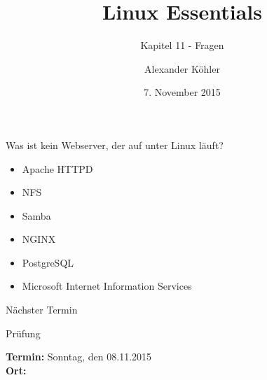 \documentclass[aspectratio=43]{beamer}
\title[Linux Essentials  - Kapitel 11 - Fragen]{Linux Essentials}
\subtitle{Kapitel 11 - Fragen}
\author{Alexander Köhler}
\date{7. November 2015}
\begin{document}
\logoframe

\frame{\titlepage}


\setcounter{tocdepth}{1}
\section[Gliederung]{}
\frame{\tableofcontents}



\begin{frame}{}
  \begin{block}{Was ist kein Webserver, der auf unter Linux läuft?}
    \begin{itemize}
      \item Apache HTTPD
      \item NFS
      \item Samba
      \item NGINX
      \item PostgreSQL
      \item Microsoft Internet Information Services
    \end{itemize}
  \end{block}
\end{frame}

\begin{frame}[plain]
  \begin{alertblock}{Nächster Termin}
    \begin{center}
      

    \Huge{Prüfung}
    \end{center}
    \textbf{Termin:} Sonntag, den 08.11.2015 \\
    \textbf{Ort:} \\
  \end{alertblock}
\end{frame}


\materialframe
\versionframe
\end{document}
